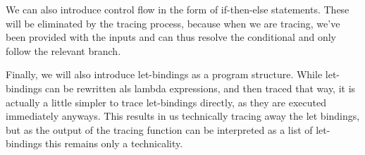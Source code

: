         We can also introduce control flow in the form of if-then-else statements.
        These will be eliminated by the tracing process, because when we are tracing, we've been provided with the inputs and can thus resolve the conditional and only follow the relevant branch.
        
        \begin{prooftree}
        \end{prooftree}

        \begin{prooftree}
        \end{prooftree}

        \begin{prooftree}
        \end{prooftree}

        Finally, we will also introduce let-bindings as a program structure.
        While let-bindings can be rewritten als lambda expressions, and then traced that way, it is actually a little simpler to trace let-bindings directly, as they are executed immediately anyways.
        This results in us technically tracing away the let bindings, but as the output of the tracing function can be interpreted as a list of let-bindings this remains only a technicality.

        \begin{prooftree}
        \end{prooftree}

